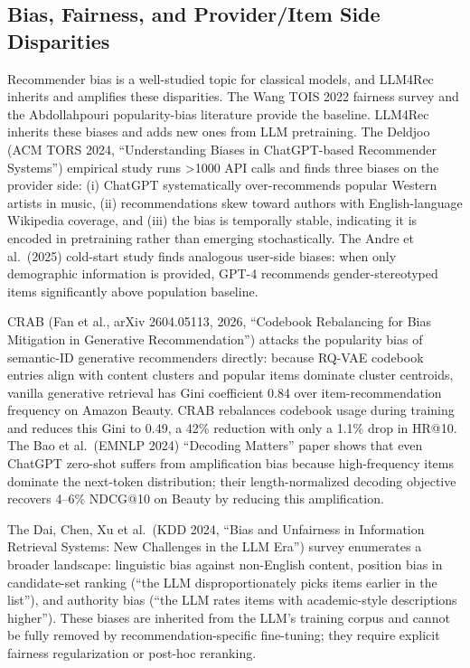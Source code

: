 \subsection{Bias, Fairness, and Provider/Item Side Disparities}\label{bias-fairness-and-provideritem-side-disparities}

Recommender bias is a well-studied topic for classical models, and LLM4Rec inherits and amplifies these disparities. The Wang TOIS 2022 fairness survey and the Abdollahpouri popularity-bias literature provide the baseline. LLM4Rec inherits these biases and adds new ones from LLM pretraining. The Deldjoo (ACM TORS 2024, ``Understanding Biases in ChatGPT-based Recommender Systems'') empirical study runs \textgreater1000 API calls and finds three biases on the provider side: (i) ChatGPT systematically over-recommends popular Western artists in music, (ii) recommendations skew toward authors with English-language Wikipedia coverage, and (iii) the bias is temporally stable, indicating it is encoded in pretraining rather than emerging stochastically. The Andre et al.~(2025) cold-start study finds analogous user-side biases: when only demographic information is provided, GPT-4 recommends gender-stereotyped items significantly above population baseline.

CRAB (Fan et al., arXiv 2604.05113, 2026, ``Codebook Rebalancing for Bias Mitigation in Generative Recommendation'') attacks the popularity bias of semantic-ID generative recommenders directly: because RQ-VAE codebook entries align with content clusters and popular items dominate cluster centroids, vanilla generative retrieval has Gini coefficient 0.84 over item-recommendation frequency on Amazon Beauty. CRAB rebalances codebook usage during training and reduces this Gini to 0.49, a 42\% reduction with only a 1.1\% drop in HR@10. The Bao et al.~(EMNLP 2024) ``Decoding Matters'' paper shows that even ChatGPT zero-shot suffers from amplification bias because high-frequency items dominate the next-token distribution; their length-normalized decoding objective recovers 4--6\% NDCG@10 on Beauty by reducing this amplification.

The Dai, Chen, Xu et al.~(KDD 2024, ``Bias and Unfairness in Information Retrieval Systems: New Challenges in the LLM Era'') survey enumerates a broader landscape: linguistic bias against non-English content, position bias in candidate-set ranking (``the LLM disproportionately picks items earlier in the list''), and authority bias (``the LLM rates items with academic-style descriptions higher''). These biases are inherited from the LLM's training corpus and cannot be fully removed by recommendation-specific fine-tuning; they require explicit fairness regularization or post-hoc reranking.

